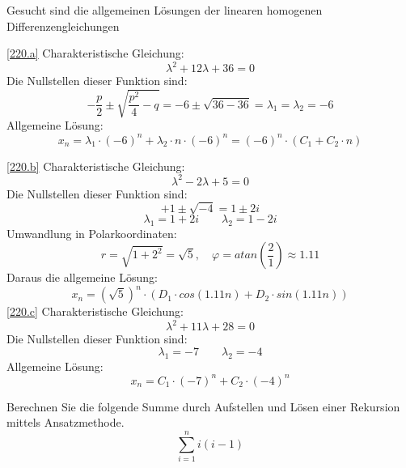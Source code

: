 \documentclass[a4paper, 12pt, margins=3cm]{homework}
\begin{document}
  \begin{problem}
    Gesucht sind die allgemeinen Lösungen der linearen homogenen Differenzengleichungen
  \end{problem}
  \begin{solution} \hfill

    \ref{220.a}
      Charakteristische Gleichung: 
      \[ \lambda^2 + 12\lambda + 36 = 0 \]
      Die Nullstellen dieser Funktion sind:
      \[ -\frac{p}{2} \pm \sqrt{\frac{p^2}{4} - q} = -6 \pm \sqrt{36-36} = \lambda_1 = \lambda_2 = -6 \]
      Allgemeine Lösung:
      \[ x_n = \lambda_1 \cdot (-6)^n + \lambda_2 \cdot n \cdot (-6)^n = (-6)^n \cdot (C_1 + C_2 \cdot n) \]

  \newpage
    
    \ref{220.b}
      Charakteristische Gleichung:
      \[ \lambda^2 - 2\lambda + 5 = 0 \]
      Die Nullstellen dieser Funktion sind:
      \[ +1 \pm \sqrt{-4} = 1 \pm 2i \]
      \[ \lambda_1 = 1 + 2i \qquad \lambda_2 = 1 - 2i\]
      Umwandlung in Polarkoordinaten:
      \[ r = \sqrt{1+2^2} = \sqrt{5}, \quad \varphi = atan(\frac{2}{1}) \approx 1.11 \]
      Daraus die allgemeine Lösung:
      \[ x_n = (\sqrt{5})^n \cdot (D_1 \cdot cos(1.11n) + D_2 \cdot sin(1.11n)) \]
    \ref{220.c}
      Charakteristische Gleichung:
      \[ \lambda^2 + 11\lambda + 28 = 0 \]
      Die Nullstellen dieser Funktion sind:
      \[ \lambda_1 = -7 \qquad \lambda_2 = -4 \]
      Allgemeine Lösung: 
      \[ x_n = C_1 \cdot (-7)^n + C_2 \cdot (-4)^n \]
  \end{solution}


  \begin{problem}
    Berechnen Sie die folgende Summe durch Aufstellen und Lösen einer Rekursion
    mittels Ansatzmethode.
    \[ \sum_{i=1}^n{i(i-1)} \]
  \end{problem}
  \begin{solution}
    
  \end{solution}
\end{document}
